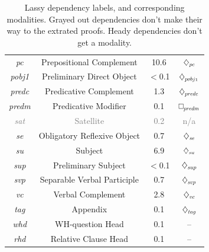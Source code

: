 \begin{table}
\begin{tabularx}{0.925\textwidth}{@{}cccc@{}}
	      \textit{pc} & Prepositional Complement &10.6& $\ddia{pc}$\\      
	      \textit{pobj1} & Preliminary Direct Object &$<$0.1& $\ddia{pobj1}$\\      
	      \textit{predc} & Predicative Complement &1.3& $\ddia{predc}$\\      
	      \textit{predm} & Predicative Modifier &0.1& $\dbox{predm}$\\      
	      \textcolor{gray}{\textit{sat}} & \textcolor{gray}{Satellite} & \textcolor{gray}{0.2} & \textcolor{gray}{{\small n/a}}\\
	      \textit{se} & Obligatory Reflexive Object &0.7& $\ddia{se}$\\      
	      \textit{su} & Subject &6.9& $\ddia{su}$\\
	      \textit{sup} & Preliminary Subject &$<$0.1& $\ddia{sup}$\\
	      \textit{svp} & Separable Verbal Participle &0.7& $\ddia{svp}$\\   
	      \textit{vc} & Verbal Complement &2.8& $\ddia{vc}$\\
	      \textit{tag} & Appendix &0.1& $\ddia{tag}$\\
	      \textit{whd} & WH-question Head &0.1 & --\\
	      \textit{rhd} & Relative Clause Head & 0.1 & --\\
	\end{tabularx}
	\caption{Lassy dependency labels, and corresponding modalities.
	Grayed out dependencies don't make their way to the extrated proofs.
	Heady dependencies don't get a modality.
	}
	\label{table:depset}
\end{table}

